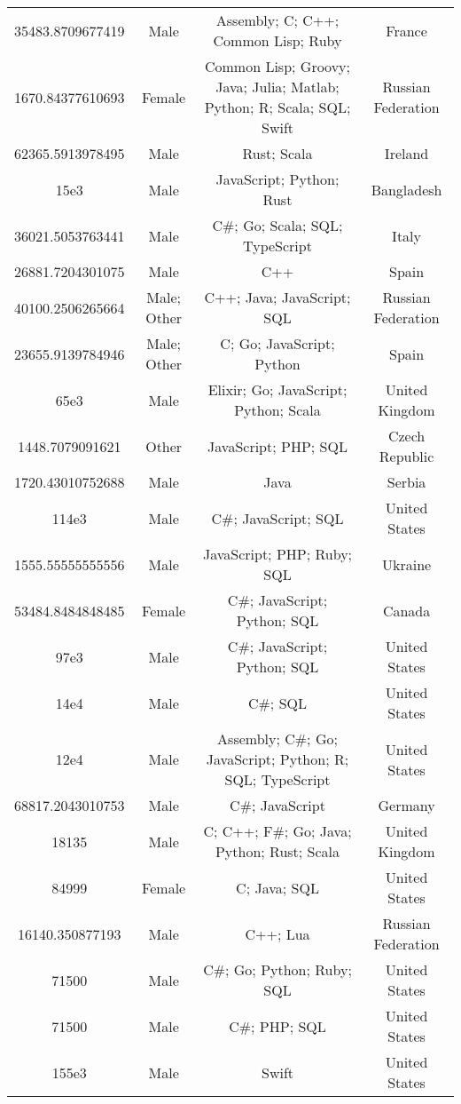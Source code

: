 \begin{center}
\begin{tabular}{ |c|c|c|c| }
35483.8709677419  &  Male  &  Assembly; C; C++; Common Lisp; Ruby  &  France  \\ 
1670.84377610693  &  Female  &  Common Lisp; Groovy; Java; Julia; Matlab; Python; R; Scala; SQL; Swift  &  Russian Federation  \\ 
62365.5913978495  &  Male  &  Rust; Scala  &  Ireland  \\ 
15e3  &  Male  &  JavaScript; Python; Rust  &  Bangladesh  \\ 
36021.5053763441  &  Male  &  C\#; Go; Scala; SQL; TypeScript  &  Italy  \\ 
26881.7204301075  &  Male  &  C++  &  Spain  \\ 
40100.2506265664  &  Male; Other  &  C++; Java; JavaScript; SQL  &  Russian Federation  \\ 
23655.9139784946  &  Male; Other  &  C; Go; JavaScript; Python  &  Spain  \\ 
65e3  &  Male  &  Elixir; Go; JavaScript; Python; Scala  &  United Kingdom  \\ 
1448.7079091621  &  Other  &  JavaScript; PHP; SQL  &  Czech Republic  \\ 
1720.43010752688  &  Male  &  Java  &  Serbia  \\ 
114e3  &  Male  &  C\#; JavaScript; SQL  &  United States  \\ 
1555.55555555556  &  Male  &  JavaScript; PHP; Ruby; SQL  &  Ukraine  \\ 
53484.8484848485  &  Female  &  C\#; JavaScript; Python; SQL  &  Canada  \\ 
97e3  &  Male  &  C\#; JavaScript; Python; SQL  &  United States  \\ 
14e4  &  Male  &  C\#; SQL  &  United States  \\ 
12e4  &  Male  &  Assembly; C\#; Go; JavaScript; Python; R; SQL; TypeScript  &  United States  \\ 
68817.2043010753  &  Male  &  C\#; JavaScript  &  Germany  \\ 
18135  &  Male  &  C; C++; F\#; Go; Java; Python; Rust; Scala  &  United Kingdom  \\ 
84999  &  Female  &  C; Java; SQL  &  United States  \\ 
16140.350877193  &  Male  &  C++; Lua  &  Russian Federation  \\ 
71500  &  Male  &  C\#; Go; Python; Ruby; SQL  &  United States  \\ 
71500  &  Male  &  C\#; PHP; SQL  &  United States  \\ 
155e3  &  Male  &  Swift  &  United States  \\ 

\end{tabular}
\end{center}
